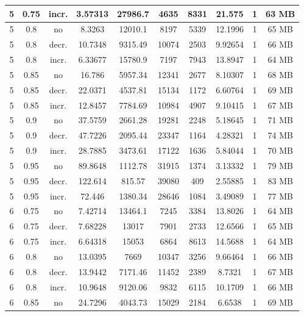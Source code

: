 \begin{longtable}{c|c|c|c|c|c|c|c|c|c}
  5  &  0.75  & incr. & 3.57313  &  27986.7 &  4635   &  8331  &  21.575   &  1  & 63  MB \\
  \hline
  5  &  0.8   & no    & 8.3263   &  12010.1 &  8197   &  5339  &  12.1996  &  1  & 65  MB \\
  5  &  0.8   & decr. & 10.7348  &  9315.49 &  10074  &  2503  &  9.92654  &  1  & 66  MB \\
  5  &  0.8   & incr. & 6.33677  &  15780.9 &  7197   &  7943  &  13.8947  &  1  & 64  MB \\
  \hline
  5  &  0.85  & no    & 16.786   &  5957.34 &  12341  &  2677  &  8.10307  &  1  & 68  MB \\
  5  &  0.85  & decr. & 22.0371  &  4537.81 &  15134  &  1172  &  6.60764  &  1  & 69  MB \\
  5  &  0.85  & incr. & 12.8457  &  7784.69 &  10984  &  4907  &  9.10415  &  1  & 67  MB \\
  \hline
  5  &  0.9   & no    & 37.5759  &  2661.28 &  19281  &  2248  &  5.18645  &  1  & 71  MB \\
  5  &  0.9   & decr. & 47.7226  &  2095.44 &  23347  &  1164  &  4.28321  &  1  & 74  MB \\
  5  &  0.9   & incr. & 28.7885  &  3473.61 &  17122  &  1636  &  5.84044  &  1  & 70  MB \\
  \hline
  5  &  0.95  & no    & 89.8648  &  1112.78 &  31915  &  1374  &  3.13332  &  1  & 79  MB \\
  5  &  0.95  & decr. & 122.614  &  815.57  &  39080  &  409   &  2.55885  &  1  & 83  MB \\
  5  &  0.95  & incr. & 72.446   &  1380.34 &  28646  &  1084  &  3.49089  &  1  & 77  MB \\
  \hline
  6  &  0.75  & no    & 7.42714  &  13464.1 &  7245   &  3384  &  13.8026  &  1  & 64  MB \\
  6  &  0.75  & decr. & 7.68228  &  13017   &  7901   &  2733  &  12.6566  &  1  & 65  MB \\
  6  &  0.75  & incr. & 6.64318  &  15053   &  6864   &  8613  &  14.5688  &  1  & 64  MB \\
  \hline
  6  &  0.8   & no    & 13.0395  &  7669    &  10347  &  3256  &  9.66464  &  1  & 66  MB \\
  6  &  0.8   & decr. & 13.9442  &  7171.46 &  11452  &  2389  &  8.7321   &  1  & 67  MB \\
  6  &  0.8   & incr. & 10.9648  &  9120.06 &  9832   &  6115  &  10.1709  &  1  & 66  MB \\
  \hline
  6  &  0.85  & no    & 24.7296  &  4043.73 &  15029  &  2184  &  6.6538   &  1  & 69  MB \\

\end{longtable}
